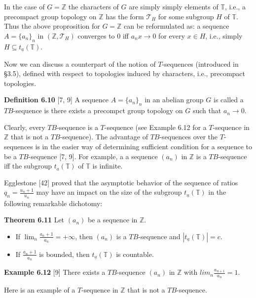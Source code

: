\documentclass[12pt]{article}
\begin{document}
\begin{itemize}
\begin{itemize}
    In the case of $G = \mathbb{Z}$ the characters of $G$ are simply simply elements of $\mathbb{T}$, i.e., a precompact group topology
on $\mathbb{Z}$ has the form $\mathcal{T}_H$ for some subgroup $H$ of $\mathbb{T}$. Thus the above proprosition for $G = \mathbb{Z}$ can be reformulated
as: a sequence $A = \{a_n\}_n$ in $(\mathbb{Z}, \mathcal{T}_H)$ converges to 0 iff $a_n x \to 0$ for every $x \in H$, i.e., simply $H \subseteq t_{\underline{a}}(\mathbb{T})$.


    Now we can discuss a counterpart of the notion of $T$-sequences (introduced in §3.5), defined with respect to
topologies induced by characters, i.e., precompact topologies.


\textbf{Definition 6.10} [7, 9] A sequence $A = \{a_n\}_n$ in an abelian group $G$ is called a $TB$-sequence is there exists a
precompct group topology on $G$ such that $a_n \to 0$.


    Clearly, every $TB$-sequence is a $T$-sequence (see Example 6.12 for a $T$-sequence in $\mathbb{Z}$ that is not a $TB$-sequence).
The advantage of $TB$-sequences over the $T$-sequences is in the easier way of determining sufficient
condition for a sequence to be a $TB$-sequence [7, 9]. For example, a a sequence $(a_n)$ in $\mathbb{Z}$ is a $TB$-sequence iff
the subgroup $t_a(\mathbb{T})$ of $\mathbb{T}$ is infinite.


    Egglestone [42] proved that the asymptotic behavior of the sequence of ratios $q_n = \frac{u_n+1}{u_n}$ may have an impact
on the size of the subgroup $t_{\underline{u}}(\mathbb{T})$ in the following remarkable dichotomy:


\textbf{Theorem 6.11} Let $(a_n)$ be a sequence in $\mathbb{Z}$.

    \begin{itemize}

        \item If $\lim_n \frac{a_n+1}{a_n} = + \infty$, then $(a_n)$ is a $TB$-sequence and $|t_{\underline{a}}(\mathbb{T})| = c$.

        \item If $\frac{a_n+1}{a_n}$ is bounded, then $t_{\underline{a}}(\mathbb{T})$ is countable.

    \end{itemize}

\textbf{Example 6.12} [9] There exists a $TB$-sequence $(a_n)$ in $\mathbb{Z}$ with $lim_n \frac{a_{n+1}}{a_n} = 1$.


    Here is an example of a $T$-sequence in $\mathbb{Z}$ that is not a $TB$-sequence.



\end{itemize}
\end{itemize}
\end{document}
